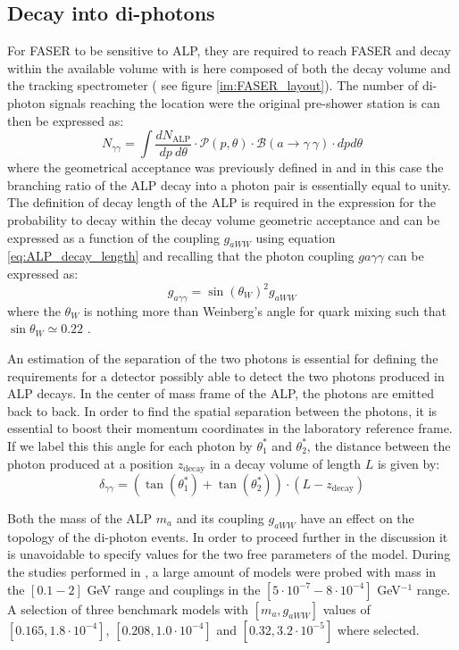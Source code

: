 		\subsection{Decay into di-photons}
		For FASER to be sensitive to ALP, they are required to reach FASER and decay within the available volume with is here composed of both the decay volume and the tracking spectrometer ( see figure \ref{im:FASER_layout}). The number of di-photon signals reaching the location were the original pre-shower station is can then be expressed as: 
		\begin{equation}
			N_{\gamma\gamma} = \int \frac{dN_{\text{ALP}}}{dp~d\theta} \cdot \mathcal{P}(p, \theta) \cdot \mathcal{B}(a \rightarrow \gamma~\gamma) \cdot dpd\theta
		\end{equation}
		where the geometrical acceptance was previously defined in  and in this case the branching ratio of the ALP decay into a photon pair is essentially equal to unity. The definition of decay length of the ALP is required in the expression for the probability to decay within the decay volume geometric acceptance and can be expressed as a function of the coupling $g_{aWW}$ using equation \ref{eq:ALP_decay_length} and recalling that the photon coupling $g{a\gamma\gamma}$ can be expressed as: 
		\begin{equation}
			g_{a\gamma\gamma} = \sin(\theta_W)^2 g_{aWW} 
		\end{equation}  
		where the $\theta_W$ is nothing more than Weinberg's angle for quark mixing such that $\sin{\theta_W} \simeq 0.22$ \cite{Weinberg}. 
		
		An estimation of the separation of the two photons is essential for defining the requirements for a detector possibly able to detect the two photons produced in ALP decays. In the center of mass frame of the ALP, the photons are emitted back to back. In order to find the spatial separation between the photons, it is essential to boost their momentum coordinates in the laboratory reference frame. If we label this this angle for each photon by $\theta^*_1$ and $\theta^*_2$, the distance between the photon produced at a position $z_{\text{decay}}$ in a decay volume of length $L$ is given by: 
		\begin{equation}
			\delta_{\gamma\gamma} = {\left( \tan(\theta^*_1) + \tan(\theta^*_2)\right)} \cdot (L-z_{\text{decay}})
		\end{equation}
		
		Both the mass of the ALP $m_a$ and its coupling $g_{aWW}$ have an effect on the topology of the di-photon events. In order to proceed further in the discussion it is unavoidable to specify values for the two free parameters of the model. During the studies performed in \cite{Moretti_MasterThesis}, a large amount of models were probed with mass in the $[0.1-2]$ GeV range and couplings in the $[5\cdot 10^{-7} - 8 \cdot 10^{-4}]$ GeV$^{-1}$ range. A selection of three benchmark models with $\left[m_a, g_{aWW}\right]$ values of $\left[0.165, 1.8\cdot 10^{-4}\right]$, $\left[0.208, 1.0\cdot 10^{-4}\right]$ and $\left[0.32, 3.2\cdot 10^{-5}\right]$ where selected. \\
		
